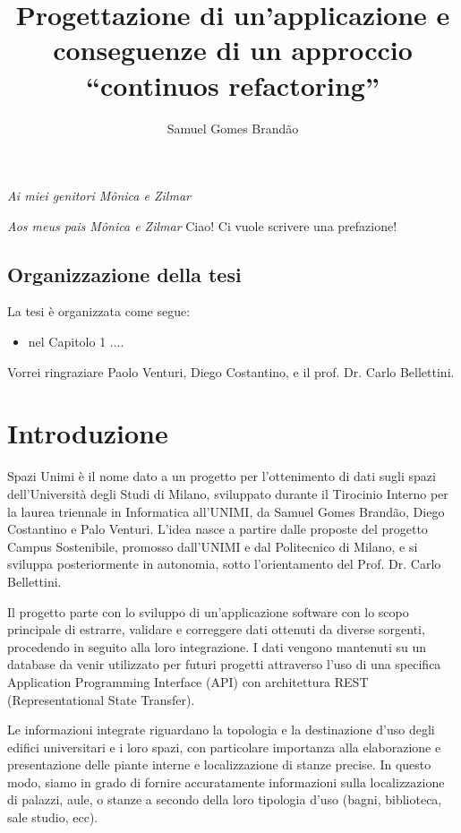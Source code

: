 \documentclass[12pt]{report}
\begin{document}
\title{Progettazione di un'applicazione e conseguenze di un approccio ``continuos refactoring''}
\author{Samuel Gomes Brandão}

\beforepreface
{}
        {\hfill \Large {\sl Ai miei genitori Mônica e Zilmar}}

        {\hfill \Large {\sl Aos meus pais Mônica e Zilmar}}
% 
%
Ciao! Ci vuole scrivere una prefazione!
%
%
\section*{Organizzazione della tesi}
\label{organizzazione}
La tesi \`e organizzata come segue:
\begin{itemize}
\item nel Capitolo 1 ....
\end{itemize}
%
%
Vorrei ringraziare Paolo Venturi, Diego Costantino, 
e il prof. Dr. Carlo Bellettini. 
\afterpreface


% 
% 
\chapter{Introduzione}
\label{cap1}

Spazi Unimi è il nome dato a un progetto per l'ottenimento di dati sugli spazi dell’Università degli Studi di Milano, sviluppato durante il Tirocinio Interno per la laurea triennale in Informatica all’UNIMI, da Samuel Gomes Brandão, Diego Costantino e Palo Venturi. L'idea nasce a partire dalle proposte del progetto Campus Sostenibile, promosso dall’UNIMI e dal Politecnico di Milano, e si sviluppa posteriormente in autonomia, sotto l'orientamento del Prof. Dr. Carlo Bellettini.

Il progetto parte con lo sviluppo di un'applicazione software con lo scopo principale di estrarre, validare e correggere dati ottenuti da diverse sorgenti, procedendo in seguito alla loro integrazione. I dati vengono mantenuti su un database da venir utilizzato per futuri progetti attraverso l'uso di una specifica Application Programming Interface (API) con architettura REST (Representational State Transfer). 

Le informazioni integrate riguardano la topologia e la destinazione d'uso degli edifici universitari e i loro spazi, con particolare importanza alla elaborazione e presentazione delle piante interne e localizzazione di stanze precise. In questo modo, siamo in grado di fornire accuratamente informazioni sulla localizzazione di palazzi, aule, o stanze a secondo della loro tipologia d'uso (bagni, biblioteca, sale studio, ecc).
\end{document}
